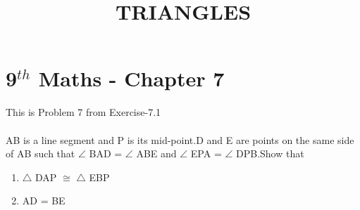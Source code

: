 \documentclass[10pt]{article}
\begin{document}
\begin{center}
\title{\textbf{TRIANGLES}}
\date{\vspace{-5ex}} %
\maketitle
\end{center}
\section{9$^{th}$ Maths - Chapter 7}

This is Problem 7 from Exercise-7.1\\\\
AB is a line segment and P is its mid-point.D and E are points on the same side of
AB such that $\angle$ BAD = $\angle$ ABE and $\angle$ EPA = $\angle$ DPB.Show that
\begin{enumerate}
\item $\triangle$ DAP $\cong$ $\triangle$ EBP
\item AD = BE
\end{enumerate}
\end{document}

